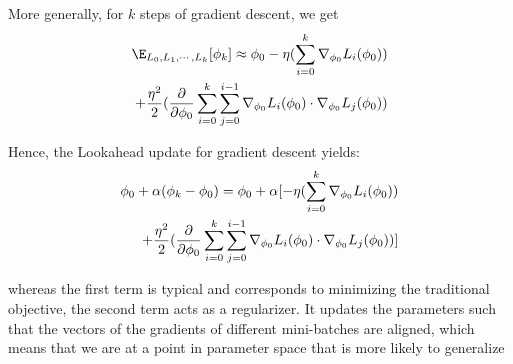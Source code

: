 \documentclass{article}
\begin{document}
More generally, for $k$ steps of gradient descent, we get 
\begin{align}
    \E_{L_0, L_1, \cdots, L_k}[\phi_k] \approx \phi_0 
    - \eta (\sum_{i=0}^k \nabla_{\phi_0} L_i(\phi_0)) \notag \\ 
    + \frac{\eta^2}{2}(\frac{\partial}{\partial \phi_0}  \sum_{i=0}^k \sum_{j=0}^{i-1} \nabla_{\phi_0} L_i(\phi_0) \cdot \nabla_{\phi_0} L_j(\phi_0))
\end{align}

Hence, the Lookahead update for gradient descent yields:
\begin{equation}
\label{eq:lookahead-update}
\begin{split}
        \phi_0 + \alpha (\phi_k - \phi_0) =  \phi_0 + \alpha[
       - \eta (\sum_{i=0}^k \nabla_{\phi_0} L_i(\phi_0)) \notag \\ 
    + \frac{\eta^2}{2} (\frac{\partial}{\partial \phi_0}  \sum_{i=0}^k \sum_{j=0}^{i-1} \nabla_{\phi_0} L_i(\phi_0) \cdot \nabla_{\phi_0} L_j(\phi_0))]
\end{split}
\end{equation}

whereas the first term is typical and corresponds to minimizing the traditional objective, the second term acts as a regularizer. It updates the parameters such that the vectors of the gradients of different mini-batches are aligned, which means that we are at a point in parameter space that is more likely to generalize 



\end{document}
